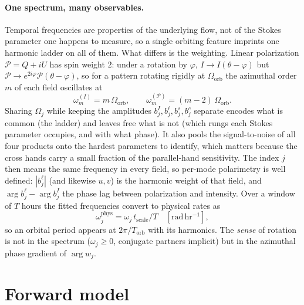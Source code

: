 \documentclass[11pt]{article}
\newcommand{\tsc}{t_{\mathrm{scale}}}
\begin{document}
\paragraph{One spectrum, many observables.}
\label{sec:sharing}
Temporal frequencies are properties of the underlying flow, not of the Stokes
parameter one happens to measure, so a single orbiting feature imprints one
harmonic ladder on all of them. What differs is the weighting. Linear polarization
$\mathcal{P}=Q+iU$ has spin weight $2$: under a rotation by $\varphi$,
$I\to I(\theta-\varphi)$ but
$\mathcal{P}\to e^{2i\varphi}\mathcal{P}(\theta-\varphi)$, so for a pattern
rotating rigidly at $\Omega_{\mathrm{orb}}$ the azimuthal order $m$ of each field
oscillates at
\begin{equation}
  \omega^{(I)}_m = m\,\Omega_{\mathrm{orb}},
  \qquad
  \omega^{(\mathcal{P})}_m = (m-2)\,\Omega_{\mathrm{orb}} .
  \label{eq:spin2}
\end{equation}
Sharing $\Omega_j$ while keeping the amplitudes $b^{I}_j,b^{\ell}_j,b^{s}_j,b^{c}_j$ separate encodes what is common (the
ladder) and leaves free what is not (which rungs each Stokes parameter occupies,
and with what phase). It also pools the signal-to-noise of all four products onto
the hardest parameters to identify, which matters because the cross hands carry a
small fraction of the parallel-hand sensitivity. The index $j$ then means the same
frequency in every
field, so per-mode polarimetry is well defined: $|b^{\ell}_j|$ (and likewise
$u,v$) is the harmonic weight of that field, and $\arg b^{\ell}_j-\arg b^{I}_j$ the
phase lag between polarization and intensity. Over a window of $T$ hours the fitted
frequencies convert to physical rates as
\begin{equation}
  \omega^{\mathrm{phys}}_j = \omega_j\,\tsc/T \quad [\mathrm{rad\,hr^{-1}}],
  \label{eq:physfreq}
\end{equation}
so an orbital period appears at $2\pi/T_{\mathrm{orb}}$ with its harmonics. The
\emph{sense} of rotation is not in the spectrum ($\omega_j\ge0$, conjugate partners
implicit) but in the azimuthal phase gradient of $\arg w_j$.

\section{Forward model}
\end{document}
